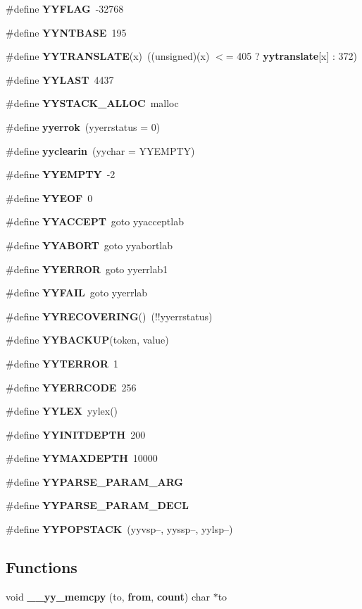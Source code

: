\begin{CompactItemize}
\item 
\#define {\bf YYFLAG}\ -32768
\item 
\#define {\bf YYNTBASE}\ 195
\item 
\#define {\bf YYTRANSLATE}(x)\ ((unsigned)(x) $<$= 405 ? {\bf yytranslate}[x] : 372)
\item 
\#define {\bf YYLAST}\ 4437
\item 
\#define {\bf YYSTACK\_\-ALLOC}\ malloc
\item 
\#define {\bf yyerrok}\ (yyerrstatus = 0)
\item 
\#define {\bf yyclearin}\ (yychar = YYEMPTY)
\item 
\#define {\bf YYEMPTY}\ -2
\item 
\#define {\bf YYEOF}\ 0
\item 
\#define {\bf YYACCEPT}\ goto yyacceptlab
\item 
\#define {\bf YYABORT}\ goto yyabortlab
\item 
\#define {\bf YYERROR}\ goto yyerrlab1
\item 
\#define {\bf YYFAIL}\ goto yyerrlab
\item 
\#define {\bf YYRECOVERING}()\ (!!yyerrstatus)
\item 
\#define {\bf YYBACKUP}(token, value)
\item 
\#define {\bf YYTERROR}\ 1
\item 
\#define {\bf YYERRCODE}\ 256
\item 
\#define {\bf YYLEX}\ yylex()
\item 
\#define {\bf YYINITDEPTH}\ 200
\item 
\#define {\bf YYMAXDEPTH}\ 10000
\item 
\#define {\bf YYPARSE\_\-PARAM\_\-ARG}
\item 
\#define {\bf YYPARSE\_\-PARAM\_\-DECL}
\item 
\#define {\bf YYPOPSTACK}\ (yyvsp--, yyssp--, yylsp--)
\end{CompactItemize}
\subsection*{Functions}
\begin{CompactItemize}
\item 
void {\bf \_\-\_\-yy\_\-memcpy} (to, {\bf from}, {\bf count}) char $\ast$to
\end{CompactItemize}
